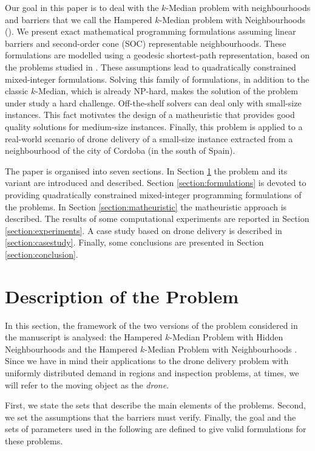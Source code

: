 \documentclass[a4paper,  review, authoryear, 1p.]{elsarticle}
\newcommand{\KMPHN}{{\sf{H-KMPHN}}}
\newcommand{\KMPN}{{\sf{H-KMPN}\xspace }}
\newcommand{\JP}[1]{{\color{blue}#1}}
\newcommand{\CV}[1]{{\color{blue}#1}}
\begin{document}
	Our goal in this paper is to deal with the $k$-Median problem with neighbourhoods and barriers that we call the Hampered $k$-Median problem with Neighbourhoods (\KMPN). We present exact mathematical programming formulations assuming linear barriers and second-order cone (SOC) representable neighbourhoods. These formulations are modelled using a geodesic shortest-path representation, based on the problems studied in \citet{mitchell2017}. These assumptions lead to quadratically constrained mixed-integer formulations. Solving this family of formulations, in addition to the classic $k$-Median, \JP{which is already NP-hard}, makes the solution of the problem under study a hard challenge. \CV{Off}-the-shelf solvers can deal only with small-size instances. This fact motivates the design of a matheuristic that provides good quality solutions for medium-size instances. \JP{Finally, this problem is applied to a real-world scenario of drone delivery of a small-size instance extracted from a neighbourhood of the city of Cordoba (in the south of Spain).}
	
	The paper is organised into seven sections. In Section \ref{section:description} the problem and its variant are introduced and described. Section \ref{section:formulations} is devoted to providing quadratically constrained mixed-integer programming formulations of the problems. In Section \ref{section:matheuristic} the matheuristic approach is described. The results of some computational experiments are reported in Section \ref{section:experiments}. \CV{A case study based on drone delivery is described in \ref{section:casestudy}}. Finally, some conclusions are presented in Section \ref{section:conclusion}.
	
	
	\section{Description of the Problem}\label{section:description}
	In this section, the framework of the two versions of the problem considered in the manuscript is analysed: the Hampered $k$-Median Problem with Hidden Neighbourhoods \KMPHN\xspace and the Hampered $k$-Median Problem with Neighbourhoods \KMPN. Since we have in mind their applications to the drone delivery problem with uniformly distributed demand in regions and inspection problems, at times, we will refer to the moving object as the \textit{drone}.
	
	First, we state the sets that describe the main elements of the problems. Second, we set the assumptions that the barriers must verify. Finally, the goal and the sets of parameters used in the following are defined to give valid formulations for these problems.
	
\end{document}
